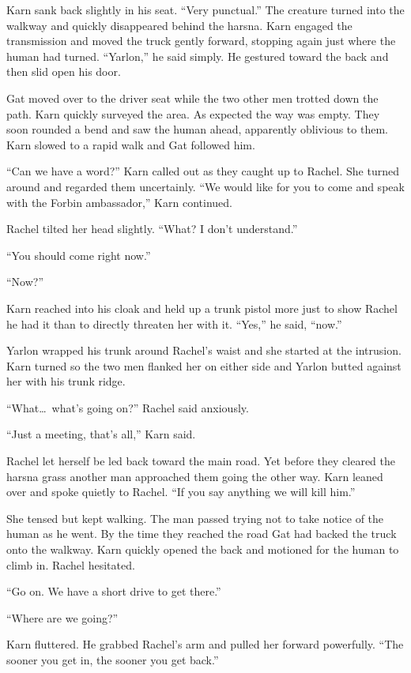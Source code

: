 Karn sank back slightly in his seat. ``Very punctual.'' The creature turned into the walkway and
quickly disappeared behind the harsna. Karn engaged the transmission and moved the truck gently
forward, stopping again just where the human had turned. ``Yarlon,'' he said simply. He gestured
toward the back and then slid open his door.

Gat moved over to the driver seat while the two other men trotted down the path. Karn quickly
surveyed the area. As expected the way was empty. They soon rounded a bend and saw the human
ahead, apparently oblivious to them. Karn slowed to a rapid walk and Gat followed him.

``Can we have a word?'' Karn called out as they caught up to Rachel. She turned around and
regarded them uncertainly. ``We would like for you to come and speak with the Forbin
ambassador,'' Karn continued.

Rachel tilted her head slightly. ``What? I don't understand.''

``You should come right now.''

``Now?''

Karn reached into his cloak and held up a trunk pistol more just to show Rachel he had it than
to directly threaten her with it. ``Yes,'' he said, ``now.''

Yarlon wrapped his trunk around Rachel's waist and she started at the intrusion. Karn turned so
the two men flanked her on either side and Yarlon butted against her with his trunk ridge.

``What\ldots\ what's going on?'' Rachel said anxiously.

``Just a meeting, that's all,'' Karn said.

Rachel let herself be led back toward the main road. Yet before they cleared the harsna grass
another man approached them going the other way. Karn leaned over and spoke quietly to Rachel.
``If you say anything we will kill him.''

She tensed but kept walking. The man passed trying not to take notice of the human as he went.
By the time they reached the road Gat had backed the truck onto the walkway. Karn quickly opened
the back and motioned for the human to climb in. Rachel hesitated.

``Go on. We have a short drive to get there.''

``Where are we going?''

Karn fluttered. He grabbed Rachel's arm and pulled her forward powerfully. ``The sooner you get
in, the sooner you get back.''

